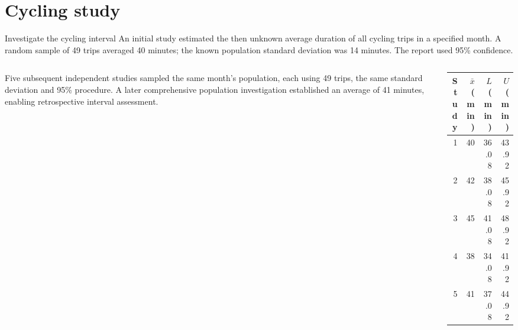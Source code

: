 \documentclass[handout,12pt,aspectratio=169]{beamer}
\begin{document}
\section{Cycling study}
\begin{frame}[t]{Investigate the cycling interval}
\small An initial study estimated the then unknown average duration of all cycling trips in a specified month. A random sample of 49 trips averaged 40 minutes; the known population standard deviation was 14 minutes. The report used 95\% confidence.\par\medskip
\begin{columns}[T,onlytextwidth]\begin{column}{.56\textwidth}Five subsequent independent studies sampled the same month's population, each using 49 trips, the same standard deviation and 95\% procedure. A later comprehensive population investigation established an average of 41 minutes, enabling retrospective interval assessment.\end{column}\begin{column}{.42\textwidth}\begin{tabular}{@{}rrrr@{}}\toprule Study & $\bar{x}$ (min) & $L$ (min) & $U$ (min)\\\midrule
1&40&36.08&43.92\\
2&42&38.08&45.92\\
3&45&41.08&48.92\\
4&38&34.08&41.92\\
5&41&37.08&44.92\\
\bottomrule\end{tabular}\end{column}\end{columns}
\end{frame}
\end{document}
